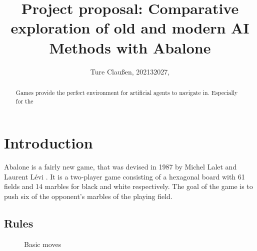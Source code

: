 \documentclass{llncs}
\begin{document}
\title{Project proposal: Comparative exploration of old and modern AI Methods with Abalone}
\author{Ture Claußen, 202132027, }

{\def\addcontentsline#1#2#3{}\maketitle} %

\begin{abstract}
  Games provide the perfect environment for artificial agents to navigate in. Especially for the
\end{abstract}

\section{Introduction}

Abalone is a fairly new game, that was devised in 1987 by Michel Lalet and Laurent Lévi \cite{noauthor_abalone_2020}. It is a two-player game consisting of a hexagonal board with 61 fields and 14 marbles for black and white respectively. The goal of the game is to push six of the opponent's marbles of the playing field.

\subsection{Rules}

\begin{figure}[!h]
  \centering
  \hfill
  \caption{Basic moves \cite{abalone_sa_abalone_nodate}}
\end{figure}
\end{document}
